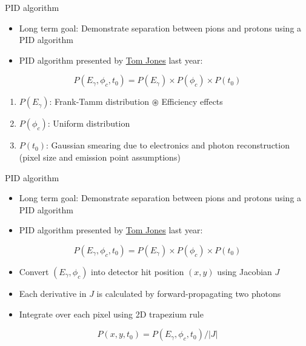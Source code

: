 \documentclass[xcolor={dvipsnames}]{beamer}
\begin{document}
\begin{frame}{PID algorithm}
  \begin{itemize}
    \setlength\itemsep{1.0em}
    \item{Long term goal: Demonstrate separation between pions and protons using a PID algorithm}
    \item{PID algorithm presented by \href{https://indico.cern.ch/event/1204659/timetable/\#21-wp3-torch-reconstruction}{Tom Jones} last year:}
  \end{itemize}
  \vspace{0.4cm}
  \begin{equation*}
    P(E_\gamma, \phi_c, t_0) = P(E_\gamma)\times P(\phi_c)\times P(t_0)
  \end{equation*}
  \begin{enumerate}
    \setlength\itemsep{1.0em}
    \item{$P(E_\gamma)$: Frank-Tamm distribution $\circledast$ Efficiency effects}
    \item{$P(\phi_c)$: Uniform distribution}
    \item{$P(t_0)$: Gaussian smearing due to electronics and photon reconstruction (pixel size and emission point assumptions)}
  \end{enumerate}
\end{frame}

\begin{frame}{PID algorithm}
  \begin{itemize}
    \setlength\itemsep{1.0em}
    \item{Long term goal: Demonstrate separation between pions and protons using a PID algorithm}
    \item{PID algorithm presented by \href{https://indico.cern.ch/event/1204659/timetable/\#21-wp3-torch-reconstruction}{Tom Jones} last year:}
  \end{itemize}
  \vspace{0.4cm}
  \begin{equation*}
    P(E_\gamma, \phi_c, t_0) = P(E_\gamma)\times P(\phi_c)\times P(t_0)
  \end{equation*}
  \vspace{-0.39cm}
  \begin{itemize}
    \setlength\itemsep{1.0em}
    \item{Convert $(E_\gamma, \phi_c)$ into detector hit position $(x, y)$ using Jacobian $J$}
    \item{Each derivative in $J$ is calculated by forward-propagating two photons}
    \item{Integrate over each pixel using 2D trapezium rule}
  \end{itemize}
  \vspace{0.4cm}
  \begin{equation*}
    P(x, y, t_0) = P(E_\gamma, \phi_c, t_0)/\lvert J\rvert
  \end{equation*}
  \vspace{-0.63cm}
\end{frame}
\end{document}
